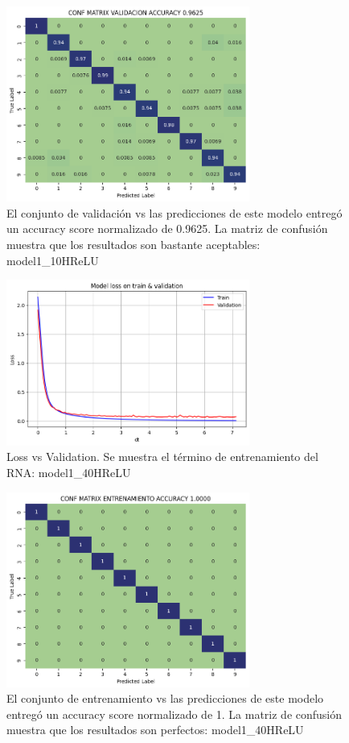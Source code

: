 \documentclass[journal]{IEEEtai}
\begin{document}
\begin{figure}[H]
\centering
\includegraphics[width=8cm]{img/model10HReLU/val.png}
\caption{El conjunto de validación vs las predicciones de este modelo entregó un accuracy score normalizado de  0.9625. La matriz de confusión muestra que los resultados son bastante aceptables: model1\_10HReLU}
\label{fig: model110HReLUVAL}
\end{figure}

\begin{figure}[H]
\centering
\includegraphics[width=8cm]{img/model40HReLU/lossvsval.png}
\caption{Loss vs Validation. Se muestra el término de entrenamiento del RNA: model1\_40HReLU}
\label{fig: model140HReLULOSSVSVAL}
\end{figure}

\begin{figure}[H]
\centering
\includegraphics[width=8cm]{img/model40HReLU/train.png}
\caption{El conjunto de entrenamiento vs las predicciones de este modelo entregó un accuracy score normalizado de  1. La matriz de confusión muestra que los resultados son perfectos: model1\_40HReLU}
\label{fig: model140HReLUTRAIN}
\end{figure}
\end{document}
